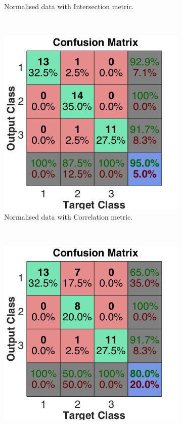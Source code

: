 \documentclass[a4paper, 10pt, conference]{ieeeconf}
\begin{document}
\begin{figure}[!ht]
\begin{subfigure}{0.32\textwidth}
      \caption{Normalised data with Intersection metric.}
    \end{subfigure}
    ~
    \begin{subfigure}{0.32\textwidth}
      \includegraphics[width=\textwidth]{pic/mod_corr.png}
      \caption{Normalised data with Correlation metric.}
    \end{subfigure}
    ~
    \begin{subfigure}{0.32\textwidth}
      \includegraphics[width=\textwidth]{pic/mod_cov_l2.png}

\end{subfigure}
\end{figure}
\end{document}
